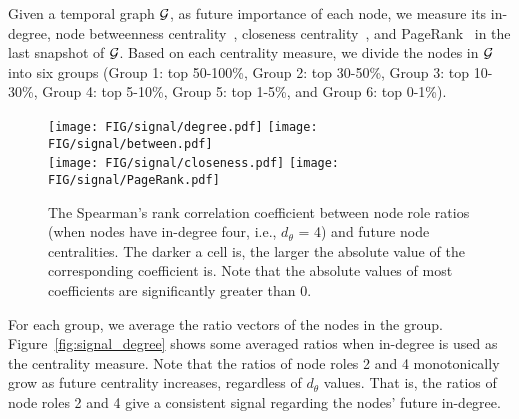 
Given a temporal graph $\mathcal{G}$, as future importance of each node, we measure its in-degree, node betweenness centrality~\cite{freeman1977set}, closeness centrality~\cite{bavelas1950communication}, and PageRank~\cite{page1999PageRank} in the last snapshot of $\mathcal{G}$.
Based on each centrality measure, we divide the nodes in $\mathcal{G}$ into six groups (Group 1: top 50-100\%, Group 2: top 30-50\%, Group 3: top 10-30\%, Group 4: top 5-10\%, Group 5: top 1-5\%, and Group 6: top 0-1\%).


\begin{figure*}[t]
    \vspace{-3mm}
    \centering
		\texttt{[image: FIG/signal/degree.pdf]}
		\texttt{[image: FIG/signal/between.pdf]} \\
            \vspace{-2mm}
		\texttt{[image: FIG/signal/closeness.pdf]}
            \texttt{[image: FIG/signal/PageRank.pdf]} \\
            \vspace{-3mm}
	\caption{\label{fig:node_signals} 
     The Spearman's rank correlation coefficient  between node role ratios (when nodes have in-degree four, i.e., $d_\theta$ = 4)
     and future node centralities.
     The darker a cell is, the larger the absolute value of the corresponding coefficient is. Note that the absolute values of most coefficients are significantly greater than $0$.
     }
\end{figure*}

For each group, we average the ratio vectors of the nodes in the group. 
Figure~\ref{fig:signal_degree} shows some averaged ratios when in-degree is used as the centrality measure. Note that the ratios of node roles 2 and 4 monotonically grow as future centrality increases, regardless of $d_\theta$ values. That is, the ratios of node roles 2 and 4 give a consistent signal regarding the nodes' future in-degree.

